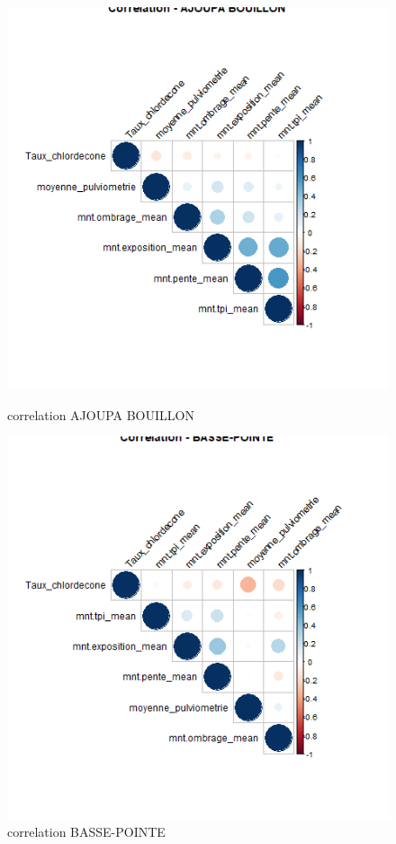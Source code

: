 \documentclass{report}
\begin{document}
\begin{figure}[H]
\begin{minipage}[t]{0.45\linewidth}
\centering
\includegraphics[width =
0.6\linewidth]{correlation_AJOUPA_BOUILLON.png}
\caption{correlation AJOUPA BOUILLON}
\end{minipage}
\hfill
\begin{minipage}[t]{0.45\linewidth}
\includegraphics[width = 0.6
\linewidth]{correlation_BASSE-POINTE.png}
\caption{correlation BASSE-POINTE}
\end{minipage}
\end{figure}
\end{document}
